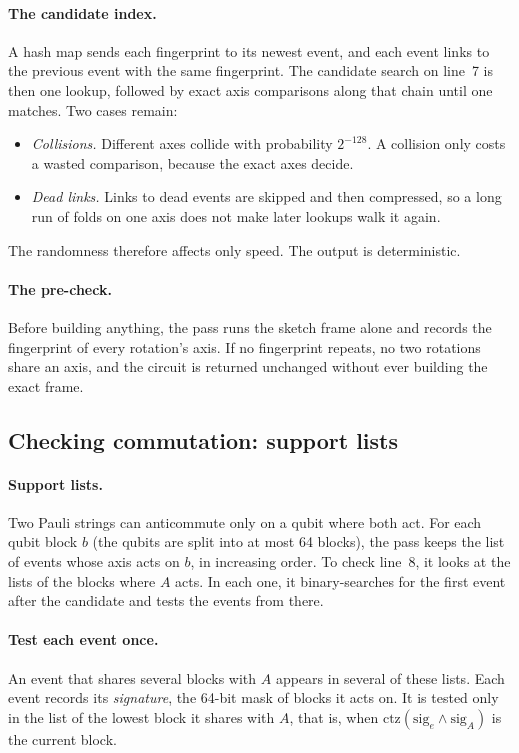 \documentclass[11pt]{article}
\theoremstyle{definition}
\theoremstyle{remark}
\begin{document}
\paragraph{The candidate index.}
A hash map sends each fingerprint to its newest event, and each event links to the
previous event with the same fingerprint. The candidate search on line~7 is then one
lookup, followed by exact axis comparisons along that chain until one matches. Two cases
remain:
\begin{itemize}[nosep]
  \item \emph{Collisions.} Different axes collide with probability $2^{-128}$. A collision
  only costs a wasted comparison, because the exact axes decide.
  \item \emph{Dead links.} Links to dead events are skipped and then compressed, so a long
  run of folds on one axis does not make later lookups walk it again.
\end{itemize}
The randomness therefore affects only speed. The output is deterministic.

\paragraph{The pre-check.}
Before building anything, the pass runs the sketch frame alone and records the
fingerprint of every rotation's axis. If no fingerprint repeats, no two rotations share an
axis, and the circuit is returned unchanged without ever building the exact frame.

\subsection{Checking commutation: support lists}

\paragraph{Support lists.}
Two Pauli strings can anticommute only on a qubit where both act. For each qubit block $b$
(the qubits are split into at most 64 blocks), the pass keeps the list of events whose
axis acts on $b$, in increasing order. To check line~8, it looks at the lists of the blocks
where $A$ acts. In each one, it binary-searches for the first event after the candidate
and tests the events from there.

\paragraph{Test each event once.}
An event that shares several blocks with $A$ appears in several of these lists. Each event
records its \emph{signature}, the 64-bit mask of blocks it acts on. It is tested only in
the list of the lowest block it shares with $A$, that is, when
$\mathrm{ctz}(\mathrm{sig}_e \wedge \mathrm{sig}_A)$ is the current block.
\end{document}
